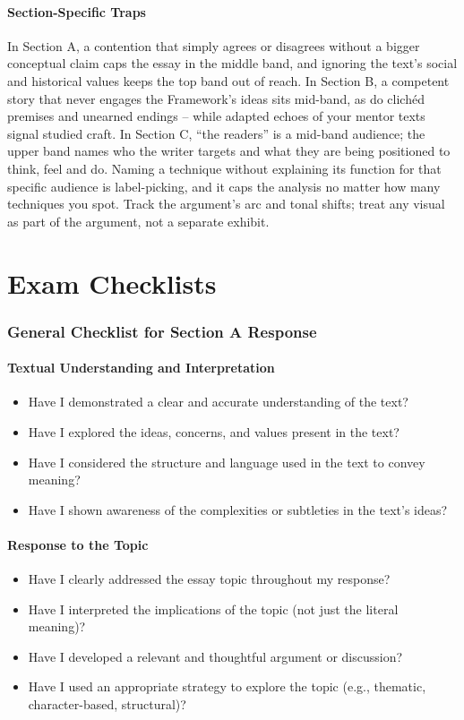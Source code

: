 \documentclass[a4paper]{article}
\makeatletter
\providecommand{\partmark}[1]{\markboth{\partname~\thepart\ #1}{\partname~\thepart\ #1}}
\let\old@part\part
\renewcommand{\part}[1]{%
  \old@part{#1}%
  \partmark{#1}%
}
\makeatother
\begin{document}
\subsection{Section-Specific Traps}
In Section A, a contention that simply agrees or disagrees without a bigger conceptual claim caps the essay in the middle band, and ignoring the text's social and historical values keeps the top band out of reach. In Section B, a competent story that never engages the Framework's ideas sits mid-band, as do clich\'ed premises and unearned endings -- while adapted echoes of your mentor texts signal studied craft. In Section C, ``the readers'' is a mid-band audience; the upper band names who the writer targets and what they are being positioned to think, feel and do. Naming a technique without explaining its function for that specific audience is label-picking, and it caps the analysis no matter how many techniques you spot. Track the argument's arc and tonal shifts; treat any visual as part of the argument, not a separate exhibit.\\

\part{Exam Checklists}
\clearpage
\thispagestyle{empty}
\hfill
\clearpage
\section*{General Checklist for Section A Response}

\subsection*{Textual Understanding and Interpretation}
\begin{itemize}
  \item Have I demonstrated a clear and accurate understanding of the text?
  \item Have I explored the ideas, concerns, and values present in the text?
  \item Have I considered the structure and language used in the text to convey meaning?
  \item Have I shown awareness of the complexities or subtleties in the text’s ideas?
\end{itemize}

\subsection*{Response to the Topic}
\begin{itemize}
  \item Have I clearly addressed the essay topic throughout my response?
  \item Have I interpreted the implications of the topic (not just the literal meaning)?
  \item Have I developed a relevant and thoughtful argument or discussion?
  \item Have I used an appropriate strategy to explore the topic (e.g., thematic, character-based, structural)?
\end{itemize}
\end{document}
